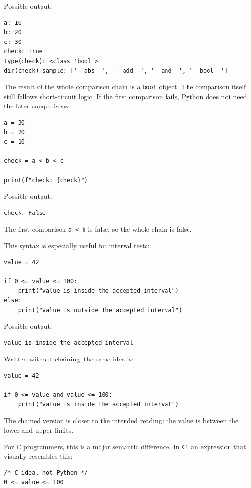 Possible output:

\begin{verbatim}
a: 10
b: 20
c: 30
check: True
type(check): <class 'bool'>
dir(check) sample: ['__abs__', '__add__', '__and__', '__bool__']
\end{verbatim}

The result of the whole comparison chain is a \texttt{bool} object. The comparison itself still follows short-circuit logic. If the first comparison fails, Python does not need the later comparisons.

\begin{verbatim}
a = 30
b = 20
c = 10

check = a < b < c

print(f"check: {check}")
\end{verbatim}

Possible output:

\begin{verbatim}
check: False
\end{verbatim}

The first comparison \texttt{a < b} is false, so the whole chain is false.

This syntax is especially useful for interval tests:

\begin{verbatim}
value = 42

if 0 <= value <= 100:
    print("value is inside the accepted interval")
else:
    print("value is outside the accepted interval")
\end{verbatim}

Possible output:

\begin{verbatim}
value is inside the accepted interval
\end{verbatim}

Written without chaining, the same idea is:

\begin{verbatim}
value = 42

if 0 <= value and value <= 100:
    print("value is inside the accepted interval")
\end{verbatim}

The chained version is closer to the intended reading: the value is between the lower and upper limits.

For C programmers, this is a major semantic difference. In C, an expression that visually resembles this:

\begin{verbatim}
/* C idea, not Python */
0 <= value <= 100
\end{verbatim}

